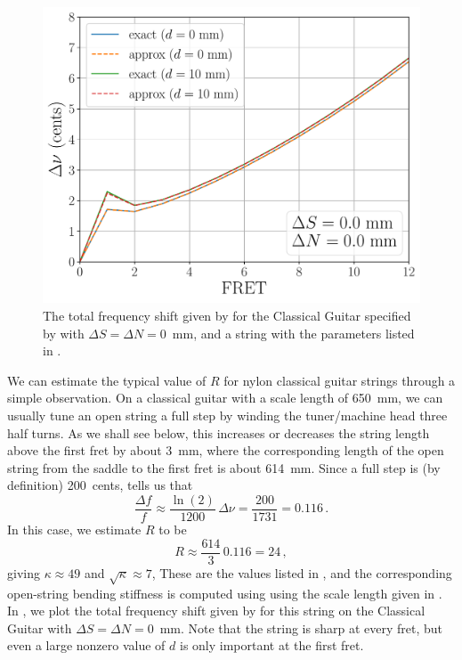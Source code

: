  \begin{figure}
  \centering
  \includegraphics[width=5.0in]{../figures/uncomp}
  \caption{\label{fig:uncomp} The total frequency shift given by  for the Classical Guitar specified by  with $\Delta S = \Delta N = 0$~mm, and a string with the parameters listed in .}
\end{figure}

We can estimate the typical value of $R$ for nylon classical guitar strings through a simple observation. On a classical guitar with a scale length of 650~mm, we can usually tune an open string a full step by winding the tuner/machine head three half turns. As we shall see below, this increases or decreases the string length above the first fret by about 3~mm, where the corresponding length of the open string from the saddle to the first fret is about 614~mm. Since a full step is (by definition) 200~cents,  tells us that
\begin{equation}
  \frac{\Delta f}{f} \approx \frac{\ln(2)}{1200}\, \Delta \nu = \frac{200}{1731} = 0.116\, .
\end{equation}
In this case, we estimate $R$ to be
\begin{equation}
  R \approx \frac{614}{3}\, 0.116 = 24\, ,
\end{equation}
giving $\kappa \approx 49$ and $\sqrt{\kappa} \approx 7$, These are the values listed in , and the corresponding open-string bending stiffness is computed using  using the scale length given in . In , we plot the total frequency shift given by  for this string on the Classical Guitar with $\Delta S = \Delta N = 0$~mm. Note that the string is sharp at every fret, but even a large nonzero value of $d$ is only important at the first fret.

